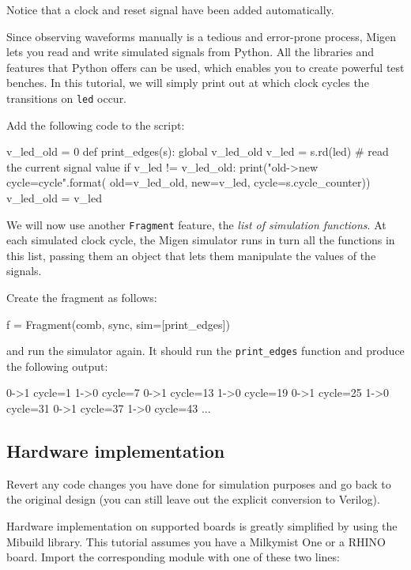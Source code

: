 \documentclass[11pt]{paper}
\begin{document}
Notice that a clock and reset signal have been added automatically.

Since observing waveforms manually is a tedious and error-prone process, Migen lets you read and write simulated signals from Python. All the libraries and features that Python offers can be used, which enables you to create powerful test benches. In this tutorial, we will simply print out at which clock cycles the transitions on \verb!led! occur.

Add the following code to the script:
\begin{verbatimtab}
v_led_old = 0
def print_edges(s):
	global v_led_old
	v_led = s.rd(led) # read the current signal value
	if v_led != v_led_old:
		print("{old}->{new} cycle={cycle}".format(
			old=v_led_old, new=v_led,
			cycle=s.cycle_counter))
		v_led_old = v_led
\end{verbatimtab}

We will now use another \verb!Fragment! feature, the \textit{list of simulation functions}. At each simulated clock cycle, the Migen simulator runs in turn all the functions in this list, passing them an object that lets them manipulate the values of the signals.

Create the fragment as follows:
\begin{verbatimtab}
f = Fragment(comb, sync, sim=[print_edges])
\end{verbatimtab}

and run the simulator again. It should run the \verb!print_edges! function and produce the following output:
\begin{verbatimtab}
0->1 cycle=1
1->0 cycle=7
0->1 cycle=13
1->0 cycle=19
0->1 cycle=25
1->0 cycle=31
0->1 cycle=37
1->0 cycle=43
...
\end{verbatimtab}


\subsection{Hardware implementation}
Revert any code changes you have done for simulation purposes and go back to the original design (you can still leave out the explicit conversion to Verilog).

Hardware implementation on supported boards is greatly simplified by using the Mibuild library. This tutorial assumes you have a Milkymist One or a RHINO board. Import the corresponding module with one of these two lines:
\end{document}

